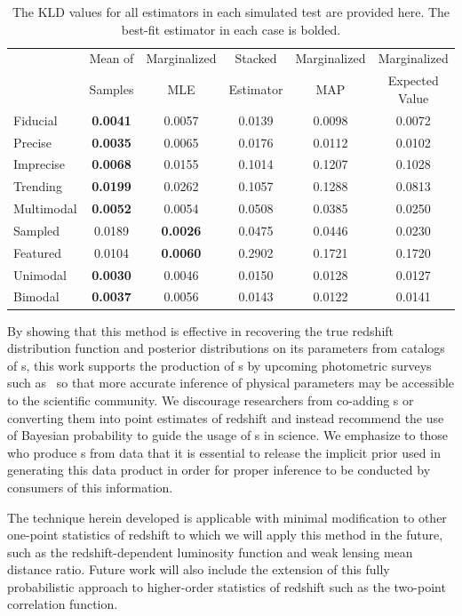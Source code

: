 \begin{table}
	\begin{tabular}{lccccc}
				& Mean of 		& Marginalized 	& Stacked 		& Marginalized 	& Marginalized\\
				& Samples 		& MLE 			& Estimator 	& MAP 			& Expected Value\\
	Fiducial 	&\textbf{0.0041}&0.0057			&0.0139			&0.0098			&0.0072\\
	Precise 	&\textbf{0.0035}&0.0065			&0.0176			&0.0112			&0.0102\\
	Imprecise 	&\textbf{0.0068}&0.0155			&0.1014			&0.1207			&0.1028\\
	Trending 	&\textbf{0.0199}&0.0262			&0.1057			&0.1288			&0.0813\\
	Multimodal 	&\textbf{0.0052}&0.0054			&0.0508			&0.0385			&0.0250\\
	Sampled 	&0.0189			&\textbf{0.0026}&0.0475			&0.0446			&0.0230\\
	Featured 	&0.0104			&\textbf{0.0060}&0.2902			&0.1721			&0.1720\\
	Unimodal 	&\textbf{0.0030}&0.0046			&0.0150			&0.0128			&0.0127\\
	Bimodal 	&\textbf{0.0037}&0.0056			&0.0143			&0.0122			&0.0141
	\end{tabular}
	\caption{The KLD values for all estimators in each simulated test are provided here.
		The best-fit estimator in each case is bolded.}
\end{table}

By showing that this method is effective in recovering the true redshift distribution function and posterior distributions on its parameters from catalogs of \pzpdf s, this work supports the production of \pzpdf s by upcoming photometric surveys such as \lsst\ so that more accurate inference of physical parameters may be accessible to the scientific community.  
We discourage researchers from co-adding \pzpdf s or converting them into point estimates of redshift and instead recommend the use of Bayesian probability to guide the usage of \pzpdf s in science.  
We emphasize to those who produce \pzpdf s from data that it is essential to release the implicit prior used in generating this data product in order for proper inference to be conducted by consumers of this information.

The technique herein developed is applicable with minimal modification to other one-point statistics of redshift to which we will apply this method in the future, such as the redshift-dependent luminosity function and weak lensing mean distance ratio.  
Future work will also include the extension of this fully probabilistic approach to higher-order statistics of redshift such as the two-point correlation function.

